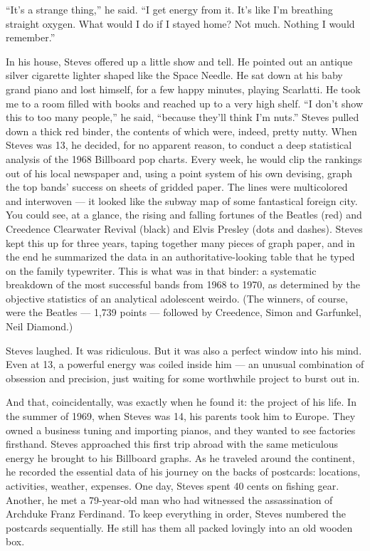 ``It's a strange thing,'' he said. ``I get energy from it. It's like I'm
breathing straight oxygen. What would I do if I stayed home? Not much.
Nothing I would remember.''

In his house, Steves offered up a little show and tell. He pointed out
an antique silver cigarette lighter shaped like the Space Needle. He sat
down at his baby grand piano and lost himself, for a few happy minutes,
playing Scarlatti. He took me to a room filled with books and reached up
to a very high shelf. ``I don't show this to too many people,'' he said,
``because they'll think I'm nuts.'' Steves pulled down a thick red
binder, the contents of which were, indeed, pretty nutty. When Steves
was 13, he decided, for no apparent reason, to conduct a deep
statistical analysis of the 1968 Billboard pop charts. Every week, he
would clip the rankings out of his local newspaper and, using a point
system of his own devising, graph the top bands' success on sheets of
gridded paper. The lines were multicolored and interwoven --- it looked
like the subway map of some fantastical foreign city. You could see, at
a glance, the rising and falling fortunes of the Beatles (red) and
Creedence Clearwater Revival (black) and Elvis Presley (dots and
dashes). Steves kept this up for three years, taping together many
pieces of graph paper, and in the end he summarized the data in an
authoritative-looking table that he typed on the family typewriter. This
is what was in that binder: a systematic breakdown of the most
successful bands from 1968 to 1970, as determined by the objective
statistics of an analytical adolescent weirdo. (The winners, of course,
were the Beatles --- 1,739 points --- followed by Creedence, Simon and
Garfunkel, Neil Diamond.)

Steves laughed. It was ridiculous. But it was also a perfect window into
his mind. Even at 13, a powerful energy was coiled inside him --- an
unusual combination of obsession and precision, just waiting for some
worthwhile project to burst out in.

And that, coincidentally, was exactly when he found it: the project of
his life. In the summer of 1969, when Steves was 14, his parents took
him to Europe. They owned a business tuning and importing pianos, and
they wanted to see factories firsthand. Steves approached this first
trip abroad with the same meticulous energy he brought to his Billboard
graphs. As he traveled around the continent, he recorded the essential
data of his journey on the backs of postcards: locations, activities,
weather, expenses. One day, Steves spent 40 cents on fishing gear.
Another, he met a 79-year-old man who had witnessed the assassination of
Archduke Franz Ferdinand. To keep everything in order, Steves numbered
the postcards sequentially. He still has them all packed lovingly into
an old wooden box.

